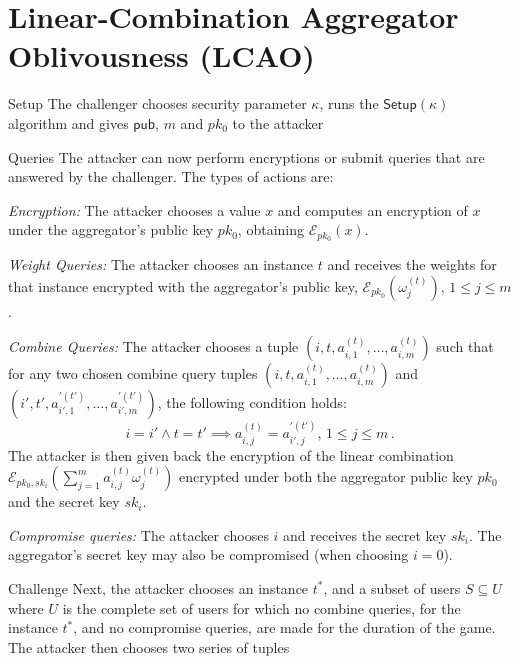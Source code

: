 \documentclass[10pt,letterpaper,oneside,twocolumn,journal]{IEEEtran}
\theoremstyle{definition}
\theoremstyle{definition}
\theoremstyle{remark}
\begin{document}
\section{Linear-Combination Aggregator Oblivousness (LCAO)} \label{app:lcao}
\begin{LaTeXdescription}
    \item[Setup] The challenger chooses security parameter $\kappa$, runs the $\mathsf{Setup}(\kappa)$ algorithm and gives $\mathsf{pub}$, $m$ and $pk_0$ to the attacker
    \item[Queries] The attacker can now perform encryptions or submit queries that are answered by the challenger. The types of actions are:
    \begin{LaTeXenumerate}
        \item \textit{Encryption:} The attacker chooses a value $x$ and computes an encryption of $x$ under the aggregator's public key $pk_0$, obtaining $\mathcal{E}_{pk_0}(x)$.
        \item \textit{Weight Queries:} The attacker chooses an instance $t$ and receives the weights for that instance encrypted with the aggregator's public key, $\mathcal{E}_{pk_0}(\omega^{(t)}_{j}),\,1\leq j\leq m$.
        \item \textit{Combine Queries:} The attacker chooses a tuple $(i,t,a^{(t)}_{i,1},\dots,a^{(t)}_{i,m})$ such that for any two chosen combine query tuples $(i,t,a^{(t)}_{i,1},\dots,a^{(t)}_{i,m})$ and $(i',t',a^{\prime(t')}_{i',1},\dots,a^{\prime(t')}_{i',m})$, the following condition holds:
        \begin{equation*}
            i = i' \wedge t = t' \implies a^{(t)}_{i,j} = a^{\prime(t')}_{i',j},\,1\leq j\leq m\,.
        \end{equation*}
        The attacker is then given back the encryption of the linear combination $\mathcal{E}_{pk_0,sk_i}(\sum^m_{j=1}a^{(t)}_{i,j}\omega^{(t)}_j)$ encrypted under both the aggregator public key $pk_0$ and the secret key $sk_i$.
        \item \textit{Compromise queries:} The attacker chooses $i$ and receives the secret key $sk_i$. The aggregator's secret key may also be compromised (when choosing $i=0$).
    \end{LaTeXenumerate} 
    \item[Challenge] Next, the attacker chooses an instance $t^*$, and a subset of users $S \subseteq U$ where $U$ is the complete set of users for which no combine queries, for the instance $t^*$, and no compromise queries, are made for the duration of the game. The attacker then chooses two series of tuples

\end{LaTeXdescription}
\end{document}
